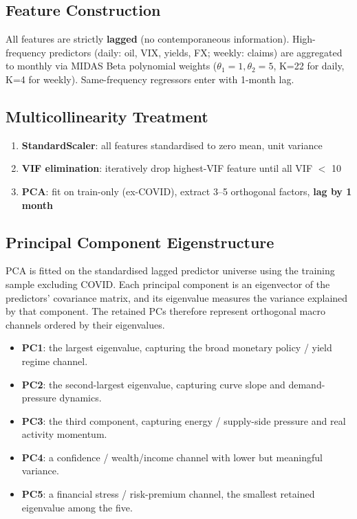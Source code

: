 \documentclass[11pt,a4paper]{article}
\begin{document}
\subsection*{Feature Construction}
All features are strictly \textbf{lagged} (no contemporaneous information). High-frequency predictors (daily: oil, VIX, yields, FX; weekly: claims) are aggregated to monthly via MIDAS Beta polynomial weights ($\theta_1=1, \theta_2=5$, K=22 for daily, K=4 for weekly). Same-frequency regressors enter with 1-month lag.

\subsection*{Multicollinearity Treatment}
\begin{enumerate}[nosep]
    \item \textbf{StandardScaler}: all features standardised to zero mean, unit variance
    \item \textbf{VIF elimination}: iteratively drop highest-VIF feature until all VIF $<$ 10
    \item \textbf{PCA}: fit on train-only (ex-COVID), extract 3--5 orthogonal factors, \textbf{lag by 1 month}
\end{enumerate}

\subsection*{Principal Component Eigenstructure}
PCA is fitted on the standardised lagged predictor universe using the training sample excluding COVID. Each principal component is an eigenvector of the predictors' covariance matrix, and its eigenvalue measures the variance explained by that component. The retained PCs therefore represent orthogonal macro channels ordered by their eigenvalues.

\begin{itemize}[nosep, leftmargin=1.2em]
    \item \textbf{PC1}: the largest eigenvalue, capturing the broad monetary policy / yield regime channel.
    \item \textbf{PC2}: the second-largest eigenvalue, capturing curve slope and demand-pressure dynamics.
    \item \textbf{PC3}: the third component, capturing energy / supply-side pressure and real activity momentum.
    \item \textbf{PC4}: a confidence / wealth/income channel with lower but meaningful variance.
    \item \textbf{PC5}: a financial stress / risk-premium channel, the smallest retained eigenvalue among the five.
\end{itemize}
\end{document}
